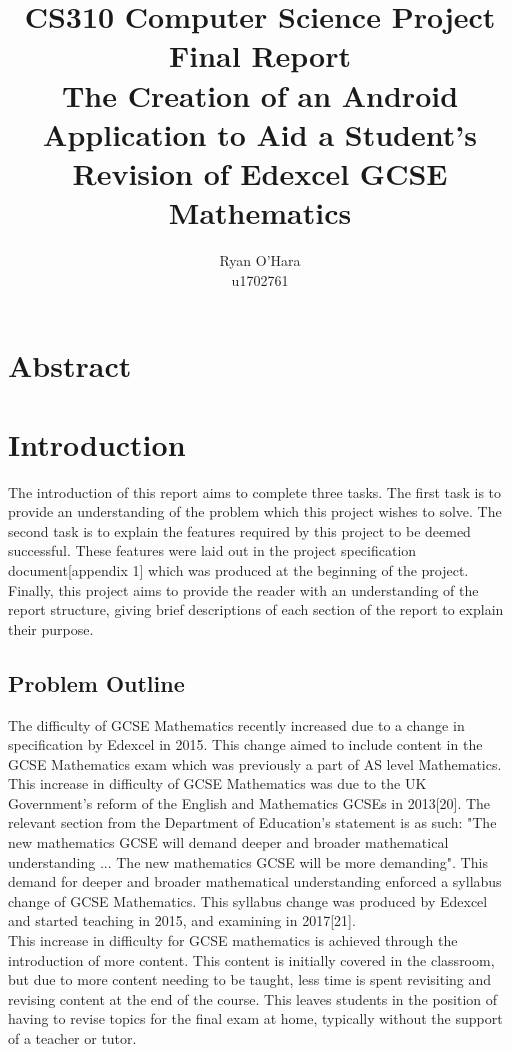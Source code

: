 \documentclass{article}
\title{CS310 Computer Science Project \\ Final Report \\ The Creation of an Android Application to Aid a Student's Revision of Edexcel GCSE Mathematics}
\author{Ryan O'Hara \\ u1702761}
\begin{document}
\maketitle

\newpage

\tableofcontents

\newpage

\section{Abstract}
\label{section:abstract}

\section{Introduction}
\label{section:introduction}

The introduction of this report aims to complete three tasks. The first task is to provide an understanding of the problem which this project wishes to solve. The second task is to explain the features required by this project to be deemed successful. These features were laid out in the project specification document[appendix 1] which was produced at the beginning of the project. Finally, this project aims to provide the reader with an understanding of the report structure, giving brief descriptions of each section of the report to explain their purpose.

\subsection{Problem Outline}

The difficulty of GCSE Mathematics recently increased due to a change in specification by Edexcel in 2015. This change aimed to include content in the GCSE Mathematics exam which was previously a part of AS level Mathematics. This increase in difficulty of GCSE Mathematics was due to the UK Government's reform of the English and Mathematics GCSEs in 2013[20]. The relevant section from the Department of Education's statement is as such: "The new mathematics GCSE will demand deeper and broader mathematical understanding ...  The new mathematics GCSE will be more demanding". This demand for deeper and broader mathematical understanding enforced a syllabus change of GCSE Mathematics. This syllabus change was produced by Edexcel and started teaching in 2015, and examining in 2017[21]. \\

This increase in difficulty for GCSE mathematics is achieved through the introduction of more content. This content is initially covered in the classroom, but due to more content needing to be taught, less time is spent revisiting and revising content at the end of the course. This leaves students in the position of having to revise topics for the final exam at home, typically without the support of a teacher or tutor. \\
\end{document}
